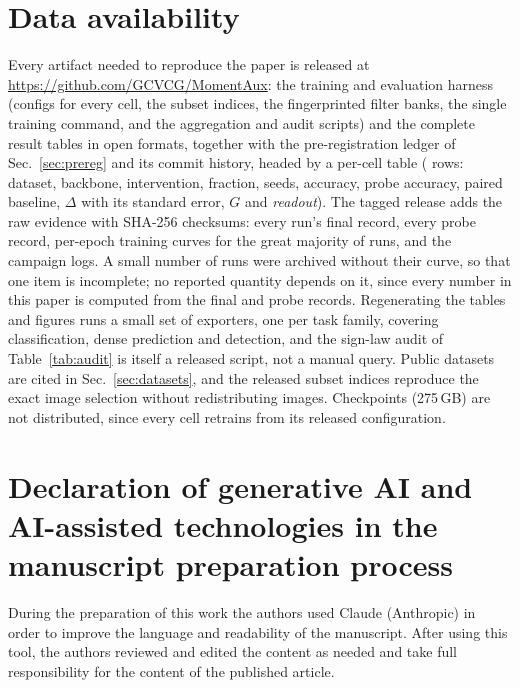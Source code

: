 \documentclass[a4paper,fleqn]{cas-dc}
\newcommand{\readout}{\textit{readout}}
\begin{document}
\section*{Data availability}
Every artifact needed to reproduce the paper is released at
\url{https://github.com/GCVCG/MomentAux}: the training and evaluation harness
(configs for every cell, the subset indices, the fingerprinted filter banks,
the single training command, and the aggregation and audit scripts) and the
complete result tables in open formats, together with the
pre-registration ledger of Sec.~\ref{sec:prereg} and its commit history,
headed by a per-cell table
(\computeCells{} rows: dataset, backbone,
intervention, fraction, seeds, accuracy, probe accuracy, paired baseline,
$\Delta$ with its standard error, $G$ and \readout). The tagged release adds the
raw evidence with SHA-256 checksums: every run's final record, every probe
record, per-epoch training curves for the great majority of runs, and the
campaign logs. A small number of runs were archived without their curve, so that one item
is incomplete; no
reported quantity depends on it, since every number in this paper is computed
from the final and probe records. Regenerating the tables and
figures runs a small set of exporters, one per task family, covering
classification, dense prediction and detection, and the sign-law audit of
Table~\ref{tab:audit} is itself a released script, not a manual query. Public datasets are cited in Sec.~\ref{sec:datasets}, and the
released subset indices reproduce the exact image selection without
redistributing images. Checkpoints (275\,GB) are not distributed, since every
cell retrains from its released configuration.

\section*{Declaration of generative AI and AI-assisted technologies in the
manuscript preparation process}
During the preparation of this work the authors used Claude (Anthropic) in
order to improve the language and readability of the manuscript. After
using this tool, the authors reviewed and edited the content as needed and
take full responsibility for the content of the published article.





\end{document}
